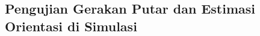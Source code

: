 \subsection{Pengujian Gerakan Putar dan Estimasi Orientasi di Simulasi}
\label{subsec:putarsimulasi}

\textcolor{red}{\lipsum[1-2]}
